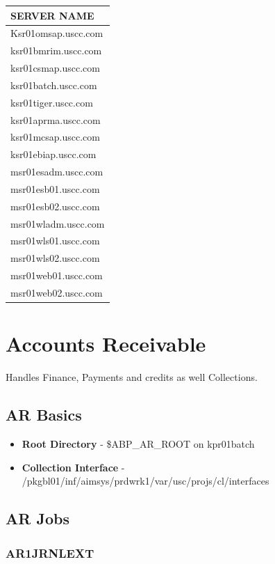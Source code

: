 \documentclass[12pt,twoside]{article}
\begin{document}
\begin{center}
\begin{tabular}{l}
\hline
 \textbf{SERVER NAME}  \\
\hline
 Ksr01omsap.uscc.com   \\
 ksr01bmrim.uscc.com   \\
 ksr01csmap.uscc.com   \\
 ksr01batch.uscc.com   \\
 ksr01tiger.uscc.com   \\
 ksr01aprma.uscc.com   \\
 ksr01mcsap.uscc.com   \\
 ksr01ebiap.uscc.com   \\
 msr01esadm.uscc.com   \\
 msr01esb01.uscc.com   \\
 msr01esb02.uscc.com   \\
 msr01wladm.uscc.com   \\
 msr01wls01.uscc.com   \\
 msr01wls02.uscc.com   \\
 msr01web01.uscc.com   \\
 msr01web02.uscc.com   \\
\hline
\end{tabular}
\end{center}
\section{Accounts Receivable}
\label{sec-11}

  Handles Finance, Payments and credits as well Collections. 
\subsection{AR Basics}
\label{sec-11-1}

\begin{itemize}
\item \textbf{Root Directory} - \$ABP\_AR\_ROOT on kpr01batch
\item \textbf{Collection Interface} - /pkgbl01/inf/aimsys/prdwrk1/var/usc/projs/cl/interfaces
\end{itemize}
\subsection{AR Jobs}
\label{sec-11-2}
\subsubsection{AR1JRNLEXT}
\label{sec-11-2-1}
\end{document}
